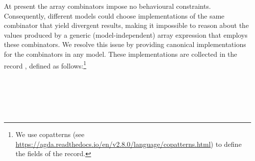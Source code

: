 At present the array combinators impose no behavioural constraints.
Consequently, different models could choose implementations of the same
combinator that yield divergent results, making it impossible to reason about
the values produced by a generic (model-independent) array expression that
employs these combinators.  We resolve this issue by providing canonical
implementations for the combinators in any model.  These implementations are
collected in the record , defined as follows:\footnote{We use
copatterns (see
\url{https://agda.readthedocs.io/en/v2.8.0/language/copatterns.html}) to
define the fields of the  record.}
\begin{code}[hide]%
\>[0]\AgdaSpace{}%
\AgdaModule{\AgdaUnderscore{}}\AgdaSpace{}%
\AgdaSymbol{(}\AgdaSpace{}%
\AgdaSymbol{:}\AgdaSpace{}%
\AgdaSymbol{)}\AgdaSpace{}%
\<%
\\
\>[0][@{}l@{\AgdaIndent{0}}]%
\>[2]\AgdaSpace{}%
\AgdaSpace{}%
\<%
\\
%
\>[2]\AgdaSpace{}%
\AgdaSpace{}%
\<%
\\
%
\>[2]\AgdaSpace{}%
\<%
\\
%
\>[2]\AgdaSpace{}%
\AgdaSpace{}%
\<%
\end{code}
